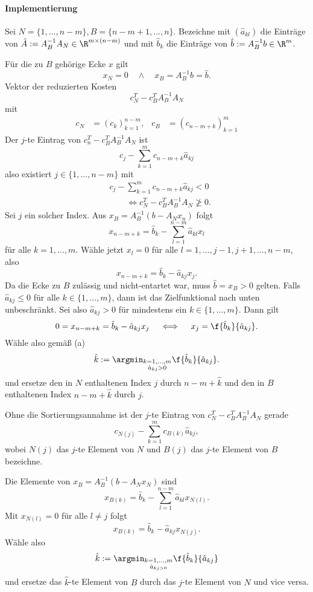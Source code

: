 \paragraph{Implementierung}

Sei \oBdA $N = \{1, \dotsc, n-m \}, B = \{n-m+1, \dotsc, n\}$.
Bezeichne mit $(\hat a_{kl})$ die Einträge von $\hat A := A_B^{-1} A_N \in \R^{m \times (n-m)}$ und mit $\hat b_k$ die Einträge von $\hat b := A_B^{-1}b \in \R^m$.

Für die zu $B$ gehörige Ecke $x$ gilt
\[
	x_N = 0
	\quad\land\quad
	x_B = A_B^{-1} b = \hat b.
\]
Vektor der reduzierten Kosten
\[
	c_N^T - c_B^T A_B^{-1} A_N
\]
mit
\begin{align*}
	c_N &= (c_k)_{k=1}^{n-m}, &
	c_B &= (c_{n-m+k})_{k=1}^{m}
\end{align*}
Der $j$-te Eintrag von $c_n^T - c_B^T A_B^{-1} A_N$ ist
\[
	c_j - \sum_{k=1}^m c_{n-m+k} \hat a_{kj}
\]
also existiert $j \in \{1, \dotsc, n-m \}$ mit
\begin{align*}
	&c_j - \sum_{k=1}^m c_{n-m+k} \hat a_{kj} < 0 \\
	&\qquad \iff c_N^T - c_B^T A_B^{-1} A_N \not\ge 0.
\end{align*}
Sei $j$ ein solcher Index.
Aus $x_B = A_B^{-1} (b - A_N x_n)$ folgt
\[
	x_{n-m+k} = \hat b_k - \sum_{l=1}^{n-m} \hat a_{kl} x_l
\]
für alle $k = 1, \dotsc, m$.
Wähle jetzt $x_l = 0$ für alle $l = 1, \dotsc, j-1, j+1, \dotsc, n-m$, also
\[
	x_{n-m+k} = \hat b_k - \hat a_{kj} x_j.
\]
Da die Ecke zu $B$ zulässig und nicht-entartet war, muss $\hat b = x_B > 0$ gelten.
Falls $\hat a_{kj} \le 0$ für alle $k \in \{1, \dotsc, m\}$, dann ist das Zielfunktional nach unten unbeschränkt.
Sei also $\hat a_{kj} > 0$ für mindestens ein $k \in \{1, \dotsc, m\}$.
Dann gilt
\[
	0 = x_{n-m+k}
	= \hat b_k - \hat a_{kj} x_j
	\quad\iff\quad
	x_j = \f {\hat b_k}{\hat a_{kj}}.
\]
Wähle also gemäß (a)
\[
	\hat k := \argmin_{\substack{k=1,\dotsc, m \\ \hat a_{kj} > 0}} \f {\hat b_k}{\hat a_{kj}}.
\]
und ersetze den in $N$ enthaltenen Index $j$ durch $n - m + \hat k$ und den in $B$ enthaltenen Index $n - m + \hat k$ durch $j$.

\begin{nt} \label{3.10}
	Ohne die Sortierungsannahme ist der $j$-te Eintrag von $c_N^T - c_B^T A_B^{-1} A_N$ gerade
	\[
		c_{N(j)} - \sum_{k=1}^m c_{B(k)} \hat a_{kj},
	\]
	wobei $N(j)$ das $j$-te Element von $N$ und $B(j)$ das $j$-te Element von $B$ bezeichne.

	Die Elemente von $x_B = A_B^{-1} (b - A_N x_N)$ sind
	\[
		x_{B(k)} = \hat b_k - \sum_{l=1}^{n-m} \hat a_{kl} x_{N(l)}.
	\]
	Mit $x_{N(l)} = 0$ für alle $l \neq j$ folgt
	\[
		x_{B(k)} = \hat b_k - \hat a_{kj} x_{N(j)}.
	\]
	Wähle also
	\[
		\hat k := \argmin_{\substack{k=1,\dotsc,m \\ \hat a_{kj > 0}}} \f {\hat b_{k}}{\hat a_{kj}}
	\]
	und ersetze das $\hat k$-te Element von $B$ durch das $j$-te Element von $N$ und vice versa.
\end{nt}

